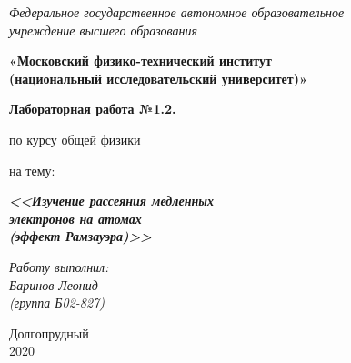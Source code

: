 \thispagestyle{empty}
\begin{center}
    \textit{Федеральное государственное автономное образовательное\\ учреждение высшего образования }

    \vspace{0.5ex}

        \textbf{«Московский физико-технический институт\\ (национальный исследовательский университет)»}
\end{center}

\vspace{10ex}

\begin{center}
    \vspace{13ex}

    \textbf{Лабораторная работа №1.2.}

    \vspace{1ex}

    по курсу общей физики

    на тему:

    \textbf{\textit{<<Изучение рассеяния медленных \\ электронов на
    атомах \\ (эффект Рамзауэра)>>}}

    \vspace{30ex}

    \begin{flushright}
        \noindent
        \textit{Работу выполнил:}\\  
        \textit{Баринов Леонид \\(группа Б02-827)}
    \end{flushright}
    \vfill
    Долгопрудный \\2020
\newpage
\setcounter{page}{1}
\fancyhead[R]{\nouppercase{\leftmark}}	
\end{center}
